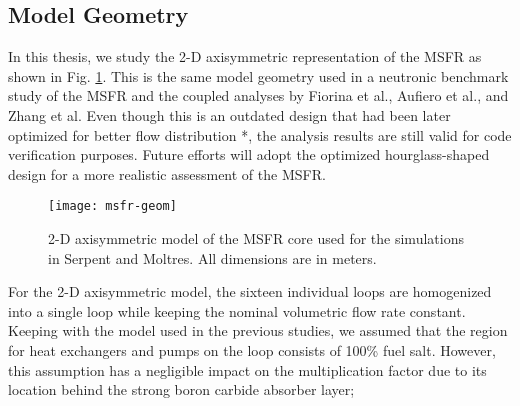 \subsection{Model Geometry}

In this thesis, we study the 2-D axisymmetric representation of the
\gls{MSFR} as shown in Fig. \ref{fig:msfrgeom}. This is the same model
geometry used in a neutronic benchmark
study of the \gls{MSFR} and the coupled analyses by Fiorina et al., Aufiero
et al., and Zhang et al. Even though this is an outdated design that had been
later optimized for better flow distribution *, the analysis results are still
valid for code verification purposes. Future efforts will adopt the optimized
hourglass-shaped design for a more realistic assessment of the \gls{MSFR}.
%
\begin{figure}[htb!] 
	\centering
	\texttt{[image: msfr-geom]}
	\caption{2-D axisymmetric model of the \gls{MSFR} core used for the
	simulations in Serpent and Moltres. All dimensions are in meters.
	\cite{brovchenko_neutronic_2019}}
	\label{fig:msfrgeom}
\end{figure}

For the 2-D axisymmetric model, the sixteen individual loops are homogenized
into a single loop while keeping the nominal volumetric flow rate constant.
Keeping with the model used in the previous studies, we assumed that the
region for heat exchangers and pumps on the loop consists of 100\% fuel salt.
However, this assumption has a negligible impact on the multiplication factor
due to its location behind the strong boron carbide absorber layer; 


